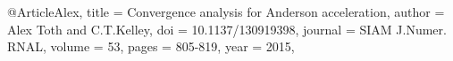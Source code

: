 




  @Article{Alex,
  title =	 {Convergence analysis for Anderson acceleration},
  author =	 {Alex Toth and C.T.Kelley},
  doi =		 {10.1137/130919398},
  journal =	 {SIAM J.Numer. RNAL},
  volume =	 {53},
  pages =	 {805-819},
  year =	 {2015},
}


